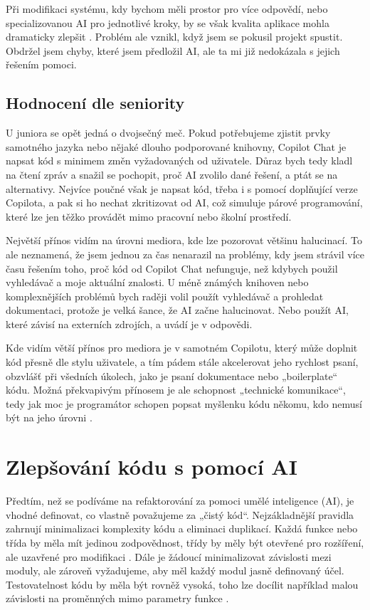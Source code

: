 \documentclass[FM,DP]{tulthesis}
\begin{document}
		Při modifikaci systému, kdy bychom měli prostor pro více odpovědí, nebo specializovanou AI pro jednotlivé kroky, by se však kvalita aplikace mohla dramaticky zlepšit \cite{autogen_saas}. Problém ale vznikl, když jsem se pokusil projekt spustit. Obdržel jsem chyby, které jsem předložil AI, ale ta mi již nedokázala s jejich řešením pomoci.
		
		\subsection{Hodnocení dle seniority}
		U juniora se opět jedná o dvojsečný meč. Pokud potřebujeme zjistit prvky samotného jazyka nebo nějaké dlouho podporované knihovny, Copilot Chat je napsat kód s minimem změn vyžadovaných od uživatele. Důraz bych tedy kladl na čtení zpráv a snažil se pochopit, proč AI zvolilo dané řešení, a ptát se na alternativy. Nejvíce poučné však je napsat kód, třeba i s pomocí doplňující verze Copilota, a pak si ho nechat zkritizovat od AI, což simuluje párové programování, které lze jen těžko provádět mimo pracovní nebo školní prostředí.
		
		Největší přínos vidím na úrovni mediora, kde lze pozorovat většinu halucinací. To ale neznamená, že jsem jednou za čas nenarazil na problémy, kdy jsem strávil více času řešením toho, proč kód od Copilot Chat nefunguje, než kdybych použil vyhledávač a moje aktuální znalosti. U méně známých knihoven nebo komplexnějších problémů bych raději volil použít vyhledávač a prohledat dokumentaci, protože je velká šance, že AI začne halucinovat. Nebo použít AI, které závisí na externích zdrojích, a uvádí je v odpovědi.
		
		Kde vidím větší přínos pro mediora je v samotném Copilotu, který může doplnit kód přesně dle stylu uživatele, a tím pádem stále akcelerovat jeho rychlost psaní, obzvlášť při všedních úkolech, jako je psaní dokumentace nebo „boilerplate“ kódu. Možná překvapivým přínosem je ale schopnost „technické komunikace“, tedy jak moc je programátor schopen popsat myšlenku kódu někomu, kdo nemusí být na jeho úrovni \cite{wikipedia:tech_comm}.
		
		\section{Zlepšování kódu s pomocí AI}
		Předtím, než se podíváme na refaktorování za pomoci umělé inteligence (AI), je vhodné definovat, co vlastně považujeme za „čistý kód“. Nejzákladnější pravidla zahrnují minimalizaci komplexity kódu a eliminaci duplikací. Každá funkce nebo třída by měla mít jedinou zodpovědnost, třídy by měly být otevřené pro rozšíření, ale uzavřené pro modifikaci \cite{wikipedia:dry} \cite{wikipedia:kiss} \cite{wikipedia:solid}. Dále je žádoucí minimalizovat závislosti mezi moduly, ale zároveň vyžadujeme, aby měl každý modul jasně definovaný účel. Testovatelnost kódu by měla být rovněž vysoká, toho lze docílit například malou závislosti na proměnných mimo parametry funkce \cite{gfg:coh_coup}.
		
\end{document}
